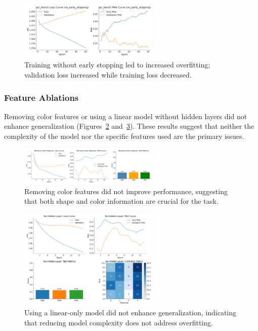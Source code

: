 \documentclass{article} %
\begin{document}
\begin{figure}[h!]
\centering
\includegraphics[width=0.6\textwidth]{spr_bench_no_early_stopping_loss_and_PHA.png}
\caption{Training without early stopping led to increased overfitting; validation loss increased while training loss decreased.}
\label{fig:no_early_stopping}
\end{figure}

\subsubsection{Feature Ablations}

Removing color features or using a linear model without hidden layers did not enhance generalization (Figures~\ref{fig:remove_color} and~\ref{fig:no_hidden_layer}). These results suggest that neither the complexity of the model nor the specific features used are the primary issues.

\begin{figure}[h!]
\centering
\includegraphics[width=0.6\textwidth]{remove_color_features_combined.png}
\caption{Removing color features did not improve performance, suggesting that both shape and color information are crucial for the task.}
\label{fig:remove_color}
\end{figure}

\begin{figure}[h!]
\centering
\includegraphics[width=0.6\textwidth]{no_hidden_layer_combined.png}
\caption{Using a linear-only model did not enhance generalization, indicating that reducing model complexity does not address overfitting.}
\label{fig:no_hidden_layer}
\end{figure}
\end{document}
